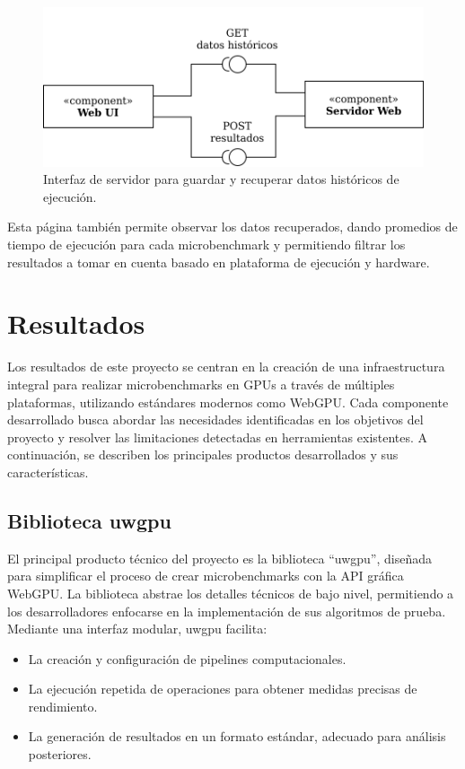 \documentclass[conference]{IEEEtran}
\begin{document}
\begin{figure}
  \includegraphics[width=\linewidth]{images/Interfaces web.png}
  \caption{Interfaz de servidor para guardar y recuperar datos históricos de ejecución.}
  \label{fig:diagrama_datos_web}
\end{figure}

Esta página también permite observar los datos recuperados, dando promedios de
tiempo de ejecución para cada microbenchmark y permitiendo filtrar los
resultados a tomar en cuenta basado en plataforma de ejecución y hardware.

\section{Resultados}

Los resultados de este proyecto se centran en la creación de una
infraestructura integral para realizar microbenchmarks en GPUs a través de
múltiples plataformas, utilizando estándares modernos como WebGPU. Cada
componente desarrollado busca abordar las necesidades identificadas en los
objetivos del proyecto y resolver las limitaciones detectadas en herramientas
existentes. A continuación, se describen los principales productos
desarrollados y sus características.

\subsection{Biblioteca uwgpu}

El principal producto técnico del proyecto es la biblioteca “uwgpu”, diseñada
para simplificar el proceso de crear microbenchmarks con la API gráfica WebGPU.
La biblioteca abstrae los detalles técnicos de bajo nivel, permitiendo a los
desarrolladores enfocarse en la implementación de sus algoritmos de prueba.
Mediante una interfaz modular, uwgpu facilita:

\begin{itemize}
	\item La creación y configuración de pipelines computacionales.
	\item La ejecución repetida de operaciones para obtener medidas precisas de rendimiento.
	\item La generación de resultados en un formato estándar, adecuado para análisis posteriores.
\end{itemize}
\end{document}
